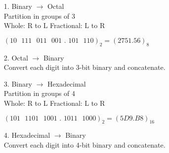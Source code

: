 \documentclass[10pt, twocolumn]{article}
\begin{document}
\begin{enumerate}
\item[1.]{Binary $\rightarrow$ Octal} \\
Partition in groups of 3 \\ 
Whole: R to L \hspace{20pt} Fractional: L to R
\begin{center}
$(10\text{ }111\text{ }011\text{ }001\text{ . }101\text{ }110)_2 = (2751.56)_8$
\end{center}
\item[2.]{Octal $\rightarrow$ Binary} \\
Convert each digit into 3-bit binary and concatenate.
\item[3.]{Binary $\rightarrow$ Hexadecimal} \\
Partition in groups of 4 \\
Whole: R to L \hspace{20pt} Fractional: L to R
\begin{center}
$(101\text{ }1101\text{ }1001\text{ . }1011\text{ }1000)_2 = (5D9.B8)_{16}$
\end{center}
\item[4.]{Hexadecimal $\rightarrow$ Binary} \\
Convert each digit into 4-bit binary and concatenate.
\end{enumerate}
\end{document}

